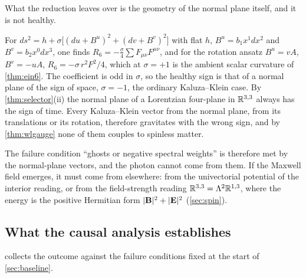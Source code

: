 What the reduction leaves over is the geometry of the normal plane itself, and it is not healthy.

\begin{theorem}
\label{thm:ghostvec}
For $ds^2=h+\sigma\bigl[(du+B^u)^2+(dv+B^v)^2\bigr]$ with flat $h$, $B^u=b_1x^1dx^2$ and $B^v=b_2x^0dx^3$, one finds $R_6=-\tfrac\sigma4\sum F_{\mu\nu}F^{\mu\nu}$, and for the
rotation ansatz $B^u=vA$, $B^v=-uA$, $R_6=-\sigma\,r^2F^2/4$, which at $\sigma=+1$ is the ambient scalar curvature of \cref{thm:ein6}. The coefficient is odd in $\sigma$, so the
healthy sign is that of a normal plane of the sign of space, $\sigma=-1$, the ordinary Kaluza--Klein case. By \cref{thm:selector}(ii) the normal plane of a Lorentzian
four-plane in $\mathbb{R}^{3,3}$ always has the sign of time. Every Kaluza--Klein vector from the normal plane, from its translations or its rotation, therefore gravitates with the
wrong sign, and by \cref{thm:wlgauge} none of them couples to spinless matter.
\end{theorem}

The failure condition ``ghosts or negative spectral weights'' is therefore met by the normal-plane vectors, and the photon cannot come from them. If the Maxwell field
emerges, it must come from elsewhere: from the univectorial potential of the interior reading, or from the field-strength reading $\mathbb{R}^{3,3}=\Lambda^2\mathbb{R}^{1,3}$, where the
energy is the positive Hermitian form $|\mathbf B|^2+|\mathbf E|^2$ (\cref{sec:spin}).

\subsection{What the causal analysis establishes}

 collects the outcome against the failure conditions fixed at the start of \cref{sec:baseline}.

